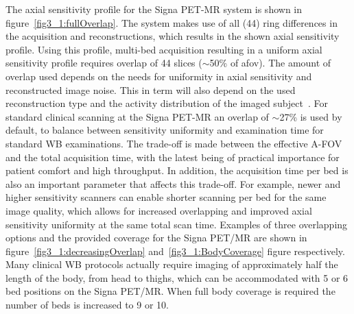 %
The axial sensitivity profile for the Signa PET-MR system is shown in figure~\ref{fig3_1:fullOverlap}. The system makes use of all (44) ring differences in the acquisition and reconstructions, which results in the shown axial sensitivity profile. Using this profile, multi-bed acquisition resulting in a uniform axial sensitivity profile requires overlap of 44 slices ($\sim$50\% of \gls{afov}).
The amount of overlap used depends on the needs for uniformity in axial sensitivity and reconstructed image noise. This in term will also depend on the used reconstruction type and the activity distribution of the imaged subject~\cite{Schubert1996}. 
For standard clinical scanning at the Signa PET-MR an overlap of $\sim$27\% is used by default, to balance between sensitivity uniformity and examination time for standard WB examinations. The trade-off is made between the effective A-FOV and the total acquisition time, with the latest being of practical importance for patient comfort and high throughput. In addition, the acquisition time per bed is also an important parameter that affects this trade-off. For example, newer and higher sensitivity scanners can enable shorter scanning per bed for the same image quality, which allows for increased overlapping and improved axial sensitivity uniformity at the same total scan time.
Examples of three overlapping options and the provided coverage for the Signa PET/MR are shown in figure~\ref{fig3_1:decreasingOverlap} and~\ref{fig3_1:BodyCoverage} figure respectively.
Many clinical WB protocols actually require imaging of approximately half the length of the body, from head to thighs, which can be accommodated with 5 or 6 bed positions on the Signa PET/MR. When full body coverage is required the number of beds is increased to 9 or 10. %
%

